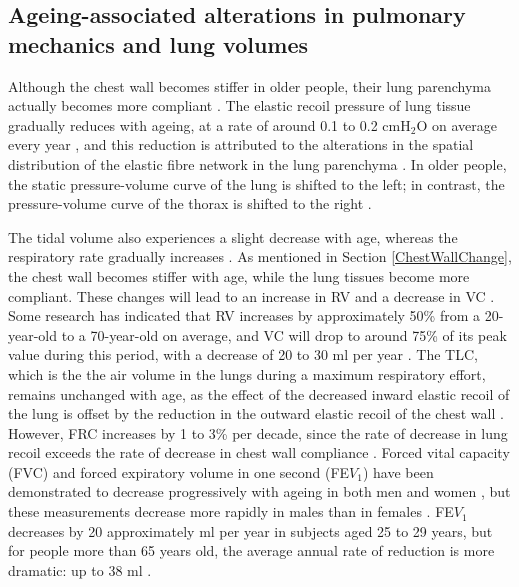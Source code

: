 \subsection{Ageing-associated alterations in pulmonary mechanics and lung volumes}
Although the chest wall becomes stiffer in older people, their lung parenchyma actually becomes more compliant \citep{mittman1965relationship, turner1968elasticity, zaugg2000respiratory}. The elastic recoil pressure of lung tissue gradually reduces with ageing, at a rate of around 0.1 to 0.2 $\mathrm{cmH_2O}$ on average every year \citep{turner1968elasticity}, and this reduction is attributed to the alterations in the spatial distribution of the elastic fibre network in the lung parenchyma \citep{sprung2006age}. In older people, the static pressure-volume curve of the lung is shifted to the left; in contrast, the pressure-volume curve of the thorax is shifted to the right \citep{zaugg2000respiratory,sprung2006age}.

The tidal volume also experiences a slight decrease with age, whereas the respiratory rate gradually increases \citep{sprung2006age}. As mentioned in Section \ref{ChestWallChange}, the chest wall becomes stiffer with age, while the lung tissues become more compliant. These changes will lead to an increase in RV and a decrease in VC \citep{lalley2013aging}. Some research has indicated that RV increases by approximately 50\% from a 20-year-old to a 70-year-old on average, and VC will drop to around 75\% of its peak value during this period, with a decrease of 20 to 30 ml per year \citep{janssens1999physiological, sprung2006age}. The TLC, which is the the air volume in the lungs during a maximum respiratory effort, remains unchanged with age, as the effect of the decreased inward elastic recoil of the lung is offset by the reduction in the outward elastic recoil of the chest wall \citep{sprung2006age}. However, FRC increases by 1 to 3\% per decade, since the rate of decrease in lung recoil exceeds the rate of decrease in chest wall compliance \citep{janssens1999physiological, lalley2013aging}. Forced vital capacity (FVC) and forced expiratory volume in one second (FE$V_1$) have been demonstrated to decrease progressively with ageing in both men and women \citep{knudson1976maximal}, but these measurements decrease more rapidly in males than in females \citep{crapo1993aging}. FE$V_1$ decreases by 20 approximately ml per year in subjects aged 25 to 29 years, but for people more than 65 years old, the average annual rate of reduction is more dramatic: up to 38 ml \citep{brandstetter1983aging}.

